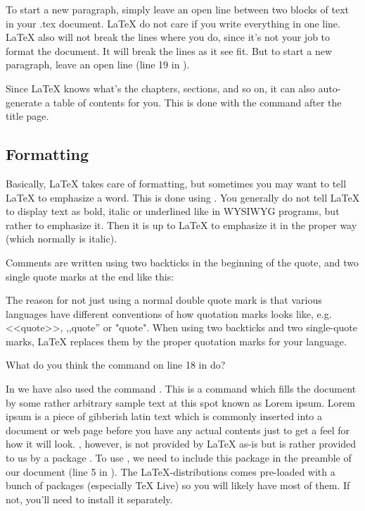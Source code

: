 To start a new paragraph, simply leave an open line between two blocks of text in your .tex document. \LaTeX{} do not care if you write everything in one line. \LaTeX{} also will not break the lines where you do, since it's not your job to format the document. It will break the lines as it see fit. But to start a new paragraph, leave an open line (line 19 in ).

Since \LaTeX{} knows what's the chapters, sections, and so on, it can also auto-generate a table of contents for you. This is done with the \latexin{\tableofcontents} command after the title page.

\subsection{Formatting}
Basically, \LaTeX{} takes care of formatting, but sometimes you may want to tell \LaTeX{} to emphasize a word. This is done using \latexin{\emph}. You generally do not tell \LaTeX{} to display text as bold, italic or underlined like in WYSIWYG programs, but rather to emphasize it. Then it is up to \LaTeX{} to emphasize it in the proper way (which normally is italic).

Comments are written using two backticks in the beginning of the quote, and two single quote marks at the end like this:


The reason for not just using a normal double quote mark is that various languages have different conventions of how quotation marks looks like, e.g. <<quote>>, ,,quote'' or "quote". When using two backticks and two single-quote marks, \LaTeX{} replaces them by the proper quotation marks for your language.

What do you think the command \latexin{\LaTeX{}} on line 18 in  do?

In  we have also used the command \latexin{\lipsum}. This is a command which fills the document by some rather arbitrary sample text at this spot known as Lorem ipsum. Lorem ipsum is a piece of gibberish latin text which is commonly inserted into a document or web page before you have any actual contents just to get a feel for how it will look. \latexin{\lipsum}, however, is not provided by \LaTeX{} as-is but is rather provided to us by a package . To use \latexin{\lipsum}, we need to include this package in the preamble of our document (line 5 in ). The \LaTeX{}-distributions comes pre-loaded with a bunch of packages (especially TeX Live) so you will likely have most of them. If not, you'll need to install it separately.

